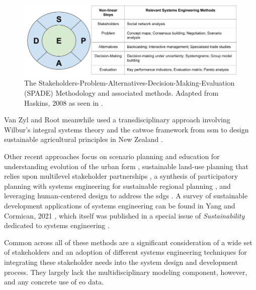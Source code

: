 \begin{figure}[h]
\centering
\includegraphics[scale=0.4]{Figures/chap3/spade.png}
\caption[The SPADE Methodology and associated methods]{The Stakeholders-Problem-Alternatives-Decision-Making-Evaluation (SPADE) Methodology and associated methods. Adapted from Haskins, 2008 \cite{haskinsSystemsEngineeringAnalyzed2008} as seen in \cite{reidSystemsEngineeringAppliedPendingPublication}.}
\label{fig:spade}
\end{figure}

Van Zyl and Root meanwhile used a transdisciplinary approach involving Wilbur's integral systems theory \cite{esbjorn-hargensOverviewIntegralTheory2010} and the \ac{catwoe} framework from \ac{ssm} \cite{checklandSoftSystemsMethodology2000} to design sustainable agricultural principles in New Zealand \cite{vanzylTransdisciplinaryDesignImplementation2020}.

Other recent approaches focus on scenario planning and education for understanding evolution of the urban form \cite{geyerSystemsEngineeringMethodology2014}, sustainable land-use planning that relies upon multilevel stakeholder partnerships \cite{puchol-salortUrbanPlanningSustainability2021}, a synthesis of participatory planning with systems engineering for sustainable regional planning \cite{aspenDevelopingParticipatoryPlanning2021}, and leveraging human-centered design to address the \acp{sdg} \cite{muellerUsingHumanCenteredDesign2020}. A survey of sustainable development applications of systems engineering can be found in Yang and Cormican, 2021 \cite{yangCrossoversConnectivitySystems2021}, which itself was published in a special issue of \textit{Sustainability} dedicated to systems engineering \cite{haskinsSystemsEngineeringSustainable2021}.

Common across all of these methods are a significant consideration of a wide set of stakeholders and an adoption of different systems engineering techniques for integrating these stakeholder needs into the system design and development process. They largely lack the multidisciplinary modeling component, however, and any concrete use of \ac{eo} data.

